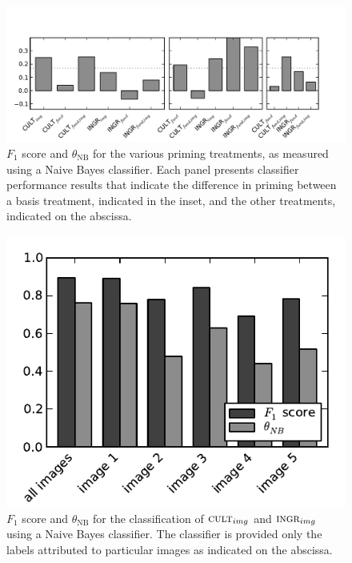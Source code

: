 \documentclass[a4paper]{report}
\begin{document}
\begin{figure}
	\includegraphics{../figs/f1-thetas.pdf}
	\caption{ $F_1$ score and $\theta_\text{NB}$ for the various 
priming treatments, as measured using a Naive Bayes classifier. Each panel 
presents classifier performance results that indicate the difference in
priming between a basis 
treatment, indicated in the inset, and the other treatments, indicated on the
abscissa. }
\end{figure}

\begin{figure}
	\includegraphics{../figs/longitudinalF1scores-t1-t2.pdf}
	\caption{ $F_1$ score and $\theta_\text{NB}$ for the classification of 
	$\textsc{cult}_{img}$ and $\textsc{ingr}_{img}$ using a Naive Bayes 
	classifier.  The classifier is provided only the labels attributed to
	particular images as indicated on the abscissa.}
\end{figure}
\end{document}

